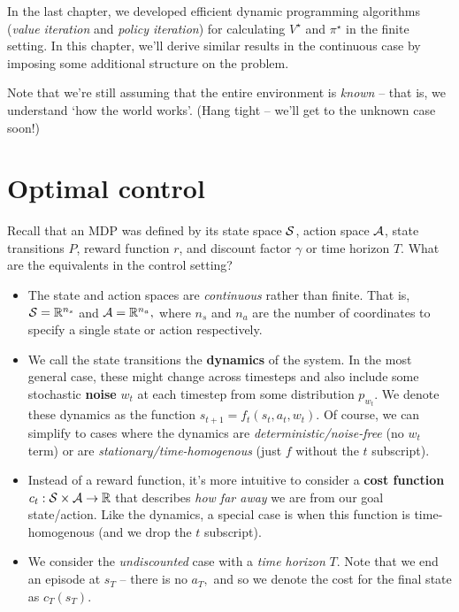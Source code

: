\documentclass[../main/main]{subfiles}
\begin{document}
In the last chapter, we developed efficient dynamic programming algorithms (\emph{value iteration} and \emph{policy iteration})
for calculating $V^\star$ and $\pi^\star$ in the finite setting.
In this chapter, we'll derive similar results in the continuous case by imposing
some additional structure on the problem.

Note that we're still assuming that the entire environment is \emph{known} --
that is, we understand `how the world works'. (Hang tight -- we'll get to the
unknown case soon!)

\section{Optimal control}

Recall that an MDP was defined by its state space $\mathcal{S}$, action space $\mathcal{A}$, state transitions $P$, reward function $r$, and discount factor $\gamma$ or time horizon $T$. What are the equivalents in the control setting?

\begin{itemize}
    \item The state and action spaces are \emph{continuous} rather than finite. That is, $\mathcal{S} = \mathbb{R}^{n_s}$ and $\mathcal{A} = \mathbb{R}^{n_a},$ where $n_s$ and $n_a$ are the number of coordinates to specify a single state or action respectively.
    \item We call the state transitions the \textbf{dynamics} of the system. In the most general case, these might change across timesteps and also include some stochastic \textbf{noise} $w_t$ at each timestep from some distribution $p_{w_t}$. We denote these dynamics as the function $s_{t+1} = f_t(s_t, a_t, w_t).$ Of course, we can simplify to cases where the dynamics are \emph{deterministic/noise-free} (no $w_t$ term) or are \emph{stationary/time-homogenous} (just $f$ without the $t$ subscript).
    \item Instead of a reward function, it's more intuitive to consider a \textbf{cost function} $c_t: \mathcal{S} \times \mathcal{A} \to \mathbb{R}$ that describes \emph{how far away} we are from our goal state/action. Like the dynamics, a special case is when this function is time-homogenous (and we drop the $t$ subscript).
    \item We consider the \emph{undiscounted} case with a \emph{time horizon} $T$. Note that we end an episode at $s_T$ -- there is no $a_T,$ and so we denote the cost for the final state as $c_T(s_T).$
\end{itemize}
\end{document}
